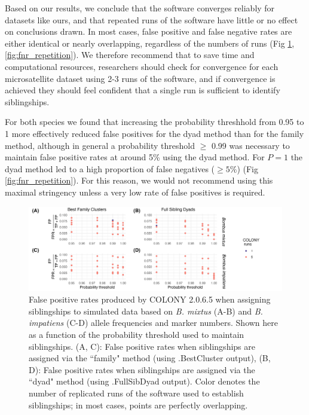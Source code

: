 \documentclass[12pt]{article}
\begin{document}
Based on our results, we conclude that the software converges reliably for datasets like ours, and that repeated runs of the software have little or no effect on conclusions drawn. In most cases, false positive and false negative rates are either identical or nearly overlapping, regardless of the numbers of runs (Fig \ref{fig:fpr_repetition}, \ref{fig:fnr_repetition}). We therefore recommend that to save time and computational resources, researchers should check for convergence for each microsatellite dataset using 2-3 runs of the software, and if convergence is achieved they should feel confident that a single run is sufficient to identify siblingships.

For both species we found that increasing the probability threshhold from 0.95 to 1 more effectively reduced false positives for the dyad method than for the family method, although in general a probability threshold $\ge$ 0.99 was necessary to maintain false positive rates at around 5\% using the dyad method. For $P = 1$ the dyad method led to a high proportion of false negatives ($\ge 5\%$) (Fig \ref{fig:fnr_repetition}). For this reason, we would not recommend using this maximal stringency unless a very low rate of false positives is required.

\begin{figure}[H]
    \centering
    \includegraphics[width=\linewidth]{appendix_figures/fpr_repetition.jpg}
    \caption{False positive rates produced by COLONY 2.0.6.5 when assigning siblingships to simulated data based on \emph{B. mixtus} (A-B) and \emph{B. impatiens} (C-D) allele frequencies and marker numbers. Shown here as a function of the probability threshold used to maintain siblingships. (A, C): False positive rates when siblingships are assigned via the ``family" method (using .BestCluster output), (B, D): False positive rates when siblingships are assigned via the ``dyad" method (using .FullSibDyad output). Color denotes the number of replicated runs of the software used to establish siblingships; in most cases, points are perfectly overlapping.}
    \label{fig:fpr_repetition}
\end{figure}
\end{document}
